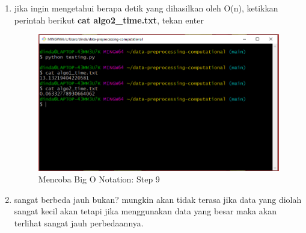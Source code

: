 \begin{enumerate}
\item jika ingin mengetahui berapa detik yang dihasilkan oleh O(n), ketikkan perintah berikut \textbf{cat algo2\_time.txt}, tekan enter
\begin{figure}[H]
        \centerline{\includegraphics[scale=0.35]{figures/mencoba-computational/step9}}
        \caption{Mencoba Big O Notation: Step 9}
\end{figure}
\item sangat berbeda jauh bukan? mungkin akan tidak terasa jika data yang diolah sangat kecil akan tetapi jika menggunakan data yang besar maka akan terlihat sangat jauh perbedaannya.
\end{enumerate}